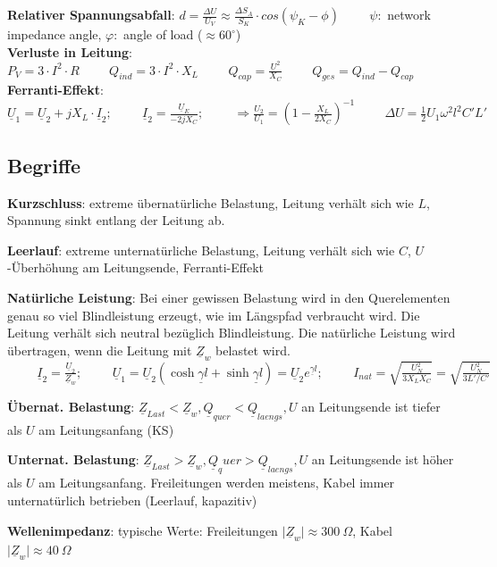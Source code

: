 		\textbf{Relativer Spannungsabfall}: $d = \frac{\Delta U}{U_V} \approx \frac{\Delta S_A}{S_K} \cdot cos(\psi_{K} - \phi) \hspace{1cm}\psi:$ network impedance angle, $\varphi:$ angle of load ($\approx 60^\circ$)\\
		\textbf{Verluste in Leitung}: $P_V = 3 \cdot I^2 \cdot R \hspace{1cm} Q_{ind} = 3 \cdot I^2 \cdot X_L \hspace{1cm} Q_{cap} = \frac{U^2}{X_C} \hspace{1cm} Q_{ges} = Q_{ind} - Q_{cap}$ \\
		\textbf{Ferranti-Effekt}: $\underline{U}_1 = \underline{U}_2 + jX_L \cdot \underline{I}_2; \hspace{1cm} \underline{I}_2 = \frac{\underline{U}_E}{-2jX_C}; \hspace{1cm} \Rightarrow \frac{U_2}{U_1} = \left(1 - \frac{X_L}{2X_C}\right)^{-1} \hspace{1cm} \Delta U = \frac{1}{2} U_1 \omega^2 l^2 C' L'$\\
		
	\subsection{Begriffe}
		\begin{itemize}
				{\small \setlength{\itemsep}{0pt}
				\item \textbf{Kurzschluss}: extreme übernatürliche Belastung, Leitung verhält sich wie $L$, Spannung sinkt entlang der Leitung ab.
				\item \textbf{Leerlauf}: extreme unternatürliche Belastung, Leitung verhält sich wie $C$, $U$-Überhöhung am Leitungsende, Ferranti-Effekt
				\item \textbf{Natürliche Leistung}: Bei einer gewissen Belastung wird in den Querelementen genau so viel Blindleistung erzeugt, wie im Längspfad verbraucht wird. Die Leitung verhält sich neutral bezüglich Blindleistung. Die natürliche Leistung wird übertragen, wenn die Leitung mit $\underline{Z}_w$ belastet wird. $\hspace{1cm} \underline{I}_2 = \frac{\underline{U}_2}{\underline{Z}_w}; \hspace{1cm} \underline{U}_1 = \underline{U}_2 \left(\cosh \underline{\gamma} l + \sinh \underline{\gamma}l\right) = \underline{U}_2e^{\underline{\gamma}l}; \hspace{1cm} I_{nat} = \sqrt{\frac{U_N^2}{3X_LX_C}} = \sqrt{\frac{U_N^2}{3L'/C'}}$
				\item \textbf{Übernat. Belastung}: $\underline{Z}_{Last} < \underline{Z}_w, \underline{Q}_{quer} < \underline{Q}_{laengs}, U$ an Leitungsende ist tiefer als $U$ am Leitungsanfang (KS)
				\item \textbf{Unternat. Belastung}: $\underline{Z}_{Last} > \underline{Z}_w, \underline{Q}_quer > \underline{Q}_{laengs}, U$ an Leitungsende ist höher als $U$ am Leitungsanfang. Freileitungen werden meistens, Kabel immer unternatürlich betrieben (Leerlauf, kapazitiv)
				\item \textbf{Wellenimpedanz}: typische Werte: Freileitungen $\lvert \underline{Z}_w \rvert \approx 300~\Omega$, Kabel $\lvert \underline{Z}_w \rvert \approx 40~\Omega$
				}
		\end{itemize}	

